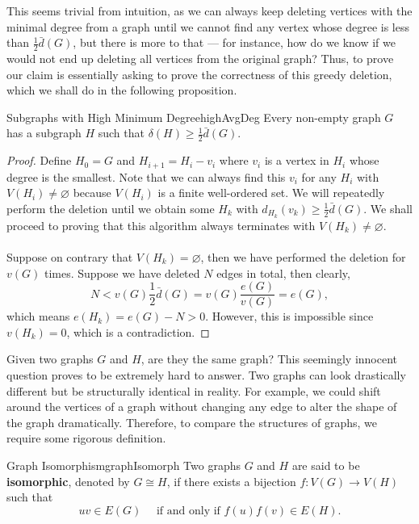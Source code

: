 \documentclass[math, code]{amznotes}
\theoremstyle{remark}
\begin{document}
This seems trivial from intuition, as we can always keep deleting vertices with the minimal degree from a graph until we cannot find any vertex whose degree is less than $\frac{1}{2}\bar{d}(G)$, but there is more to that --- for instance, how do we know if we would not end up deleting all vertices from the original graph? Thus, to prove our claim is essentially asking to prove the correctness of this greedy deletion, which we shall do in the following proposition.
\begin{probox}{Subgraphs with High Minimum Degree}{highAvgDeg}
    Every non-empty graph $G$ has a subgraph $H$ such that $\delta(H) \geq \frac{1}{2} \bar{d}(G)$.
    \tcblower
    \begin{proof}
        Define $H_0 = G$ and $H_{i + 1} = H_i - v_i$ where $v_i$ is a vertex in $H_i$ whose degree is the smallest. Note that we can always find this $v_i$ for any $H_i$ with $V(H_i) \neq \varnothing$ because $V(H_i)$ is a finite well-ordered set. We will repeatedly perform the deletion until we obtain some $H_k$ with $d_{H_k}(v_k) \geq \frac{1}{2}\bar{d}(G)$. We shall proceed to proving that this algorithm always terminates with $V(H_k) \neq \varnothing$.
        \\\\
        Suppose on contrary that $V(H_k) = \varnothing$, then we have performed the deletion for $v(G)$ times. Suppose we have deleted $N$ edges in total, then clearly,
        \begin{equation*}
            N < v(G)\frac{1}{2}\bar{d}(G) = v(G)\frac{e(G)}{v(G)} = e(G),
        \end{equation*}
        which means $e(H_k) = e(G) - N > 0$. However, this is impossible since $v(H_k) = 0$, which is a contradiction.
    \end{proof}
\end{probox}
Given two graphs $G$ and $H$, are they the same graph? This seemingly innocent question proves to be extremely hard to answer. Two graphs can look drastically different but be structurally identical in reality. For example, we could shift around the vertices of a graph without changing any edge to alter the shape of the graph dramatically. Therefore, to compare the structures of graphs, we require some rigorous definition.
\begin{dfnbox}{Graph Isomorphism}{graphIsomorph}
    Two graphs $G$ and $H$ are said to be {\color{red} \textbf{isomorphic}}, denoted by $G \cong H$, if there exists a bijection $f \colon V(G) \to V(H)$ such that
    \begin{equation*}
        uv \in E(G) \quad\textrm{ if and only if } f(u)f(v) \in E(H).
    \end{equation*}
\end{dfnbox}
\end{document}

